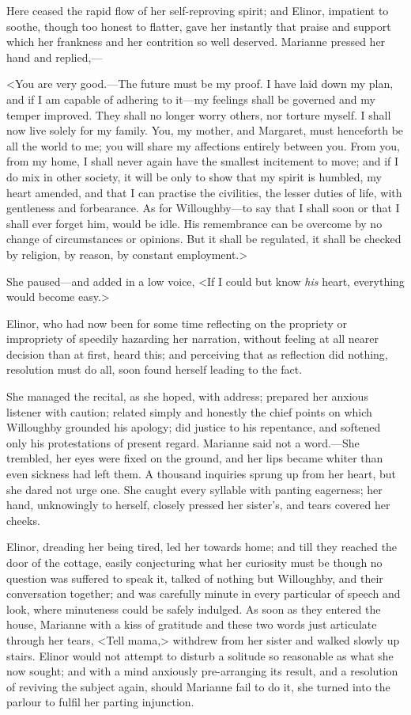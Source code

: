Here ceased the rapid flow of her self-reproving spirit; and Elinor, impatient to soothe, though too honest to flatter, gave her instantly that praise and support which her frankness and her contrition so well deserved. Marianne pressed her hand and replied,—

<You are very good.—The future must be my proof. I have laid down my plan, and if I am capable of adhering to it—my feelings shall be governed and my temper improved. They shall no longer worry others, nor torture myself. I shall now live solely for my family. You, my mother, and Margaret, must henceforth be all the world to me; you will share my affections entirely between you. From you, from my home, I shall never again have the smallest incitement to move; and if I do mix in other society, it will be only to show that my spirit is humbled, my heart amended, and that I can practise the civilities, the lesser duties of life, with gentleness and forbearance. As for Willoughby—to say that I shall soon or that I shall ever forget him, would be idle. His remembrance can be overcome by no change of circumstances or opinions. But it shall be regulated, it shall be checked by religion, by reason, by constant employment.>

She paused—and added in a low voice, <If I could but know \textit{his} heart, everything would become easy.>

Elinor, who had now been for some time reflecting on the propriety or impropriety of speedily hazarding her narration, without feeling at all nearer decision than at first, heard this; and perceiving that as reflection did nothing, resolution must do all, soon found herself leading to the fact.

She managed the recital, as she hoped, with address; prepared her anxious listener with caution; related simply and honestly the chief points on which Willoughby grounded his apology; did justice to his repentance, and softened only his protestations of present regard. Marianne said not a word.—She trembled, her eyes were fixed on the ground, and her lips became whiter than even sickness had left them. A thousand inquiries sprung up from her heart, but she dared not urge one. She caught every syllable with panting eagerness; her hand, unknowingly to herself, closely pressed her sister's, and tears covered her cheeks.

Elinor, dreading her being tired, led her towards home; and till they reached the door of the cottage, easily conjecturing what her curiosity must be though no question was suffered to speak it, talked of nothing but Willoughby, and their conversation together; and was carefully minute in every particular of speech and look, where minuteness could be safely indulged. As soon as they entered the house, Marianne with a kiss of gratitude and these two words just articulate through her tears, <Tell mama,> withdrew from her sister and walked slowly up stairs. Elinor would not attempt to disturb a solitude so reasonable as what she now sought; and with a mind anxiously pre-arranging its result, and a resolution of reviving the subject again, should Marianne fail to do it, she turned into the parlour to fulfil her parting injunction.